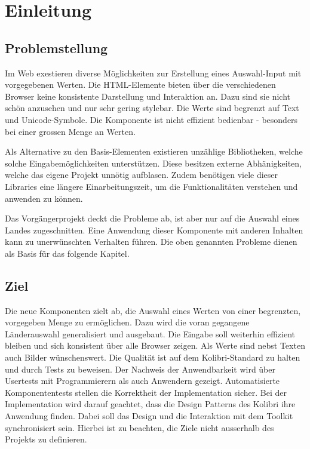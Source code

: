 \chapter{Einleitung}


\section{Problemstellung}

Im Web exestieren diverse Möglichkeiten zur Erstellung eines Auswahl-Input mit vorgegebenen Werten.
Die HTML-Elemente bieten über die verschiedenen Browser keine konsistente Darstellung und Interaktion an.
Dazu sind sie nicht schön anzusehen und nur sehr gering stylebar. 
Die Werte sind begrenzt auf Text und Unicode-Symbole.
Die Komponente ist nicht effizient bedienbar - besonders bei einer grossen Menge an Werten.

Als Alternative zu den Basis-Elementen existieren unzählige Bibliotheken, welche solche Eingabemöglichkeiten unterstützen.
Diese besitzen externe Abhänigkeiten, welche das eigene Projekt unnötig aufblasen.
Zudem benötigen viele dieser Libraries eine längere Einarbeitungszeit, um die Funktionalitäten verstehen und anwenden zu können.

Das Vorgängerprojekt deckt die Probleme ab, ist aber nur auf die Auswahl eines Landes zugeschnitten.
Eine Anwendung dieser Komponente mit anderen Inhalten kann zu unerwünschten Verhalten führen.
Die oben genannten Probleme dienen als Basis für das folgende Kapitel.


\section{Ziel}

Die neue Komponenten zielt ab, die Auswahl eines Werten von einer begrenzten, vorgegeben Menge zu ermöglichen.
Dazu wird die voran gegangene Länderauswahl generalisiert und ausgebaut.
Die Eingabe soll weiterhin effizient bleiben und sich konsistent über alle Browser zeigen.
Als Werte sind nebst Texten auch Bilder wünschenswert.
Die Qualität ist auf dem Kolibri-Standard zu halten und durch Tests zu beweisen.
Der Nachweis der Anwendbarkeit wird über Usertests mit Programmierern als auch Anwendern gezeigt.
Automatisierte Komponententests stellen die Korrektheit der Implementation sicher.
Bei der Implementation wird darauf geachtet, dass die Design Patterns des Kolibri ihre Anwendung finden.
Dabei soll das Design und die Interaktion mit dem Toolkit synchronisiert sein.
Hierbei ist zu beachten, die Ziele nicht ausserhalb des Projekts zu definieren.


